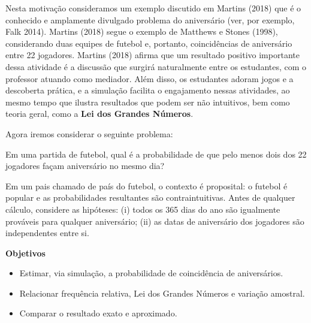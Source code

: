\documentclass[
  letterpaper,
  DIV=11,
  numbers=noendperiod]{scrreprt}
\begin{document}
Nesta motivação consideramos um exemplo discutido em Martins (2018) que
é o conhecido e amplamente divulgado problema do aniversário (ver, por
exemplo, Falk 2014). Martins (2018) segue o exemplo de Matthews e Stones
(1998), considerando duas equipes de futebol e, portanto, coincidências
de aniversário entre 22 jogadores. Martins (2018) afirma que um
resultado positivo importante dessa atividade é a discussão que surgirá
naturalmente entre os estudantes, com o professor atuando como mediador.
Além disso, os estudantes adoram jogos e a descoberta prática, e a
simulação facilita o engajamento nessas atividades, ao mesmo tempo que
ilustra resultados que podem ser não intuitivos, bem como teoria geral,
como a \textbf{Lei dos Grandes Números}.

Agora iremos considerar o seguinte problema:

\begin{tcolorbox}[enhanced jigsaw, left=2mm, toprule=.15mm, opacityback=0, title=\textcolor{quarto-callout-tip-color}{\faLightbulb}\hspace{0.5em}{Problema}, leftrule=.75mm, breakable, colbacktitle=quarto-callout-tip-color!10!white, coltitle=black, rightrule=.15mm, bottomtitle=1mm, toptitle=1mm, colframe=quarto-callout-tip-color-frame, colback=white, opacitybacktitle=0.6, bottomrule=.15mm, arc=.35mm, titlerule=0mm]

Em uma partida de futebol, qual é a probabilidade de que pelo menos dois
dos 22 jogadores façam aniversário no mesmo dia?

\end{tcolorbox}

Em um pais chamado de país do futebol, o contexto é proposital: o
futebol é popular e as probabilidades resultantes são contraintuitivas.
Antes de qualquer cálculo, considere as hipóteses: (i) todos os 365 dias
do ano são igualmente prováveis para qualquer aniversário; (ii) as datas
de aniversário dos jogadores são independentes entre si.

\textbf{Objetivos}

\begin{itemize}
\item
  Estimar, via simulação, a probabilidade de coincidência de
  aniversários.
\item
  Relacionar frequência relativa, Lei dos Grandes Números e variação
  amostral.
\item
  Comparar o resultado exato e aproximado.
\end{itemize}
\end{document}
